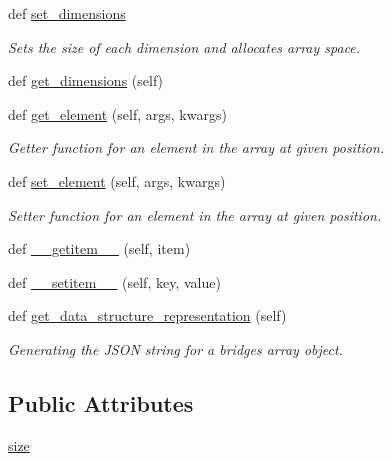 \begin{DoxyCompactItemize}
def \hyperlink{classbridges_1_1array_1_1_array_a9824fe5690df106136c3b4eada33e420}{set\+\_\+dimensions}
\begin{DoxyCompactList}\small\item\em Sets the size of each dimension and allocates array space. \end{DoxyCompactList}\item 
def \hyperlink{classbridges_1_1array_1_1_array_ae224fa7fe9363e2d47231e36638b500f}{get\+\_\+dimensions} (self)
\item 
def \hyperlink{classbridges_1_1array_1_1_array_ae02a649c2d9a1b830b36650d5a308105}{get\+\_\+element} (self, args, kwargs)
\begin{DoxyCompactList}\small\item\em Getter function for an element in the array at given position. \end{DoxyCompactList}\item 
def \hyperlink{classbridges_1_1array_1_1_array_a371bbcb9aa75562a2c3f04ef1bb33faf}{set\+\_\+element} (self, args, kwargs)
\begin{DoxyCompactList}\small\item\em Setter function for an element in the array at given position. \end{DoxyCompactList}\item 
def \hyperlink{classbridges_1_1array_1_1_array_ad97d5a2cb4bffa4a6bcdb15a3ece0974}{\+\_\+\+\_\+getitem\+\_\+\+\_\+} (self, item)
\item 
def \hyperlink{classbridges_1_1array_1_1_array_a97fd57b09a0b8ae221ecaa50c1c483b1}{\+\_\+\+\_\+setitem\+\_\+\+\_\+} (self, key, value)
\item 
def \hyperlink{classbridges_1_1array_1_1_array_a7c6af86feb0ec470afe56505d9ce0cc8}{get\+\_\+data\+\_\+structure\+\_\+representation} (self)
\begin{DoxyCompactList}\small\item\em Generating the J\+S\+ON string for a bridges array object. \end{DoxyCompactList}\end{DoxyCompactItemize}
\subsection*{Public Attributes}
\begin{DoxyCompactItemize}
\item 
\hyperlink{classbridges_1_1array_1_1_array_aeac1b1639d0284500f354d41b40c38f7}{size}
\end{DoxyCompactItemize}
